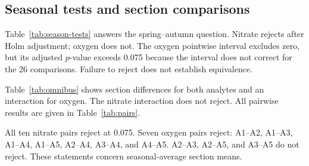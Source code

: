 \subsection{Seasonal tests and section comparisons}
Table~\ref{tab:season-tests} answers the spring--autumn question. Nitrate rejects after Holm adjustment; oxygen does not. The oxygen pointwise interval excludes zero, but its adjusted $p$-value exceeds 0.075 because the interval does not correct for the 26 comparisons. Failure to reject does not establish equivalence.

\begin{table}[H]
\centering\footnotesize\singlespacing

\caption{Spring minus autumn, averaged over sections. Differences and pointwise intervals are in mg/L.}\label{tab:season-tests}
\end{table}

Table~\ref{tab:omnibus} shows section differences for both analytes and an interaction for oxygen. The nitrate interaction does not reject. All pairwise results are given in Table~\ref{tab:pairs}.

\begin{table}[H]
\centering\footnotesize\singlespacing

\caption{Joint robust Wald tests with chi-square reference distributions.}\label{tab:omnibus}
\end{table}

\begin{table}[H]
\centering\footnotesize\singlespacing

\caption{Section contrasts: first section minus second, averaged over seasons, in mg/L. All three test tables share one 26-test Holm adjustment. Very small adjusted $p$-values are shown as $<10^{-99}$.}\label{tab:pairs}
\end{table}

All ten nitrate pairs reject at 0.075. Seven oxygen pairs reject: A1--A2, A1--A3, A1--A4, A1--A5, A2--A4, A3--A4, and A4--A5. A2--A3, A2--A5, and A3--A5 do not reject. These statements concern seasonal-average section means.
